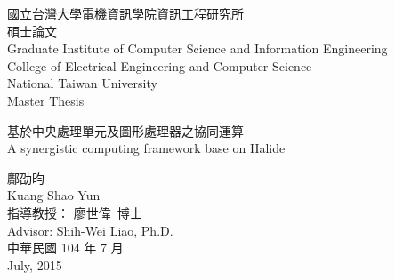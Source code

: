 \begin{titlepage}
\Large %
\begin{minipage}[c]{.95\textwidth}
\centering
國立台灣大學電機資訊學院資訊工程研究所\\ [-.3\baselineskip]
碩士論文\\ [-.1\baselineskip]
\large{
{%
Graduate Institute of Computer Science and Information Engineering\\ [-.3\baselineskip]
College of Electrical Engineering and Computer Science\\ [-.3\baselineskip]
National Taiwan University\\ [-.3\baselineskip]
Master Thesis}}
\end{minipage}

\begin{minipage}[c][.4\textheight][c]{.95\textwidth}
\centering
     基於中央處理單元及圖形處理器之協同運算\\
     {
     A synergistic computing framework base on  Halide\\[-.5\baselineskip] 
     }
\end{minipage}

\vspace{1.1cm}
\begin{minipage}[c][.3\textheight][c]{.95\textwidth}
\centering
鄺劭昀\\[-.3\baselineskip]
{%
Kuang Shao Yun}\\%
指導教授： 廖世偉\ 博士\\[-.3\baselineskip] 
{%
Advisor: Shih-Wei Liao, Ph.D.}\\
中華民國 104 年 7 月\\[-.3\baselineskip] { July, 2015 }  %
\end{minipage}
\pagestyle{empty} %
\cleardoublepage %
\end{titlepage}
